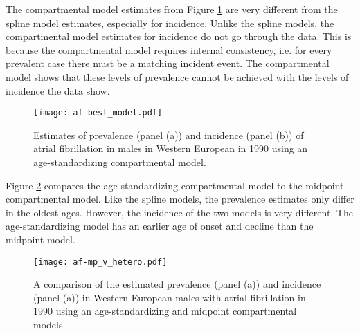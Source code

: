 The compartmental model estimates from Figure \ref{fig:app-af age-stand} 
are very different from the spline model estimates, especially for incidence.  
Unlike the spline models, the compartmental model estimates for 
incidence do not go through the data.  This is because the compartmental model 
requires internal consistency, i.e. for every prevalent case there must be 
a matching incident event.  The compartmental model shows that these levels 
of prevalence cannot be achieved with the levels of incidence the data show.

    \begin{figure}[h]
        \begin{center}
            \texttt{[image: af-best\_model.pdf]}
            \caption{Estimates of prevalence (panel (a)) and incidence (panel (b))
              of atrial fibrillation in males in Western European in 1990 using
              an age-standardizing compartmental model.}
            \label{fig:app-af age-stand}
        \end{center}
    \end{figure}

Figure \ref{fig:app-af compare} compares the age-standardizing compartmental 
model to the midpoint compartmental model.  Like the spline models, 
the prevalence estimates only differ in the oldest ages.  However, the 
incidence of the two models is very different.  The age-standardizing model 
has an earlier age of onset and decline than the midpoint model.

    \begin{figure}[h]
        \begin{center}
            \texttt{[image: af-mp\_v\_hetero.pdf]}
            \caption{A comparison of the estimated prevalence (panel (a)) and incidence (panel
              (a)) in Western European males with atrial fibrillation in 1990 using
              an age-standardizing and midpoint compartmental models.}
            \label{fig:app-af compare}
        \end{center}
    \end{figure}
